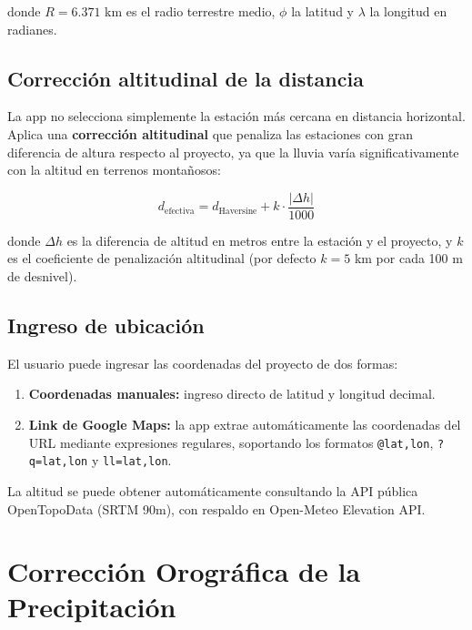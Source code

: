 \documentclass[12pt, a4paper]{article}
\begin{document}
donde $R = 6.371$ km es el radio terrestre medio, $\phi$ la latitud y $\lambda$ la longitud en radianes.

\subsection{Corrección altitudinal de la distancia}

La app no selecciona simplemente la estación más cercana en distancia horizontal. Aplica una \textbf{corrección altitudinal} que penaliza las estaciones con gran diferencia de altura respecto al proyecto, ya que la lluvia varía significativamente con la altitud en terrenos montañosos:

\begin{equation}
    d_{\text{efectiva}} = d_{\text{Haversine}} + k \cdot \frac{|\Delta h|}{1000}
\end{equation}

donde $\Delta h$ es la diferencia de altitud en metros entre la estación y el proyecto, y $k$ es el coeficiente de penalización altitudinal (por defecto $k = 5$ km por cada 100 m de desnivel).

\subsection{Ingreso de ubicación}

El usuario puede ingresar las coordenadas del proyecto de dos formas:

\begin{enumerate}
    \item \textbf{Coordenadas manuales:} ingreso directo de latitud y longitud decimal.
    \item \textbf{Link de Google Maps:} la app extrae automáticamente las coordenadas del URL mediante expresiones regulares, soportando los formatos \texttt{@lat,lon}, \texttt{?q=lat,lon} y \texttt{ll=lat,lon}.
\end{enumerate}

La altitud se puede obtener automáticamente consultando la API pública OpenTopoData (SRTM 90m), con respaldo en Open-Meteo Elevation API.

\section{Corrección Orográfica de la Precipitación}
\end{document}
